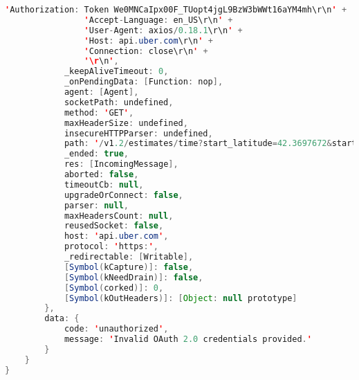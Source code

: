 \begin{lstlisting}[language=Java, caption=Pesan Error Perkakas \textit{Uber CLI}]
                'Authorization: Token We0MNCaIpx00F_TUopt4jgL9BzW3bWWt16aYM4mh\r\n' +
                'Accept-Language: en_US\r\n' +
                'User-Agent: axios/0.18.1\r\n' +
                'Host: api.uber.com\r\n' +
                'Connection: close\r\n' +
                '\r\n',
            _keepAliveTimeout: 0,
            _onPendingData: [Function: nop],
            agent: [Agent],
            socketPath: undefined,
            method: 'GET',
            maxHeaderSize: undefined,
            insecureHTTPParser: undefined,
            path: '/v1.2/estimates/time?start_latitude=42.3697672&start_longitude=-71.077356',
            _ended: true,
            res: [IncomingMessage],
            aborted: false,
            timeoutCb: null,
            upgradeOrConnect: false,
            parser: null,
            maxHeadersCount: null,
            reusedSocket: false,
            host: 'api.uber.com',
            protocol: 'https:',
            _redirectable: [Writable],
            [Symbol(kCapture)]: false,
            [Symbol(kNeedDrain)]: false,
            [Symbol(corked)]: 0,
            [Symbol(kOutHeaders)]: [Object: null prototype]
        },
        data: {
            code: 'unauthorized',
            message: 'Invalid OAuth 2.0 credentials provided.'
        }
    }
}
\end{lstlisting}

% 

